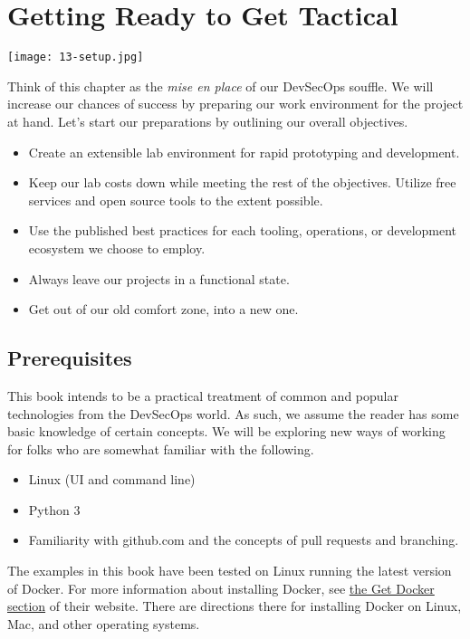 \chapter{Getting Ready to Get Tactical}

\centering
\texttt{[image: 13-setup.jpg]}


\justifying
Think of this chapter as the \emph{mise en place} of our DevSecOps souffle. We will increase our chances of success
by preparing our work environment for the project at hand. Let's start our preparations by outlining our
overall objectives.

\justifying
\begin{itemize}
	\item Create an extensible lab environment for rapid prototyping and development.
	\item Keep our lab costs down while meeting the rest of the objectives. Utilize free services and open source tools to the extent possible.
	\item Use the published best practices for each tooling, operations, or development ecosystem we choose to employ.
	\item Always leave our projects in a functional state.
	\item Get out of our old comfort zone, into a new one.
\end{itemize}

\section{Prerequisites}

\justifying
This book intends to be a practical treatment of common and popular technologies from the DevSecOps world. As such, we assume
the reader has some basic knowledge of certain concepts. We will be exploring new ways of working for folks who
are somewhat familiar with the following.

\begin{itemize}
	\item  Linux (UI and command line)
	\item  Python 3
	\item  Familiarity with github.com and the concepts of pull requests and branching.
\end{itemize}

\justifying
The examples in this book have been tested on Linux running the latest version of Docker. For more
information about installing Docker, see \href{https://docs.docker.com/get-docker/}{the Get Docker section}
of their website. There are directions there for installing Docker on Linux, Mac, and other operating systems.

